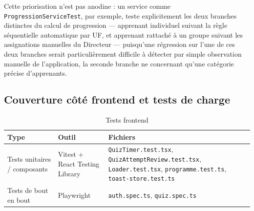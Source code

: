 
Cette priorisation n'est pas anodine : un service comme
\texttt{ProgressionServiceTest}, par exemple, teste explicitement les deux
branches distinctes du calcul de progression --- apprenant individuel
suivant la règle séquentielle automatique par UF, et apprenant rattaché à
un groupe suivant les assignations manuelles du Directeur --- puisqu'une
régression sur l'une de ces deux branches serait particulièrement
difficile à détecter par simple observation manuelle de l'application, la
seconde branche ne concernant qu'une catégorie précise d'apprenants.

\subsection{Couverture côté frontend et tests de charge}

\begin{table}[H]
  \centering
  \caption{Tests frontend}
  \label{tab:tests-frontend}
  \begin{tabular}{|p{3.2cm}|p{3.5cm}|p{7.3cm}|}
    \toprule
    Type & Outil & Fichiers \\
    \midrule
    Tests unitaires / composants & Vitest + React Testing Library &
      \texttt{QuizTimer.test.tsx}, \texttt{QuizAttemptReview.test.tsx},
      \texttt{Loader.test.tsx}, \texttt{programme.test.ts},
      \texttt{toast-store.test.ts} \\ \hline
    Tests de bout en bout & Playwright & \texttt{auth.spec.ts}, \texttt{quiz.spec.ts} \\
    \bottomrule
  \end{tabular}
\end{table}

